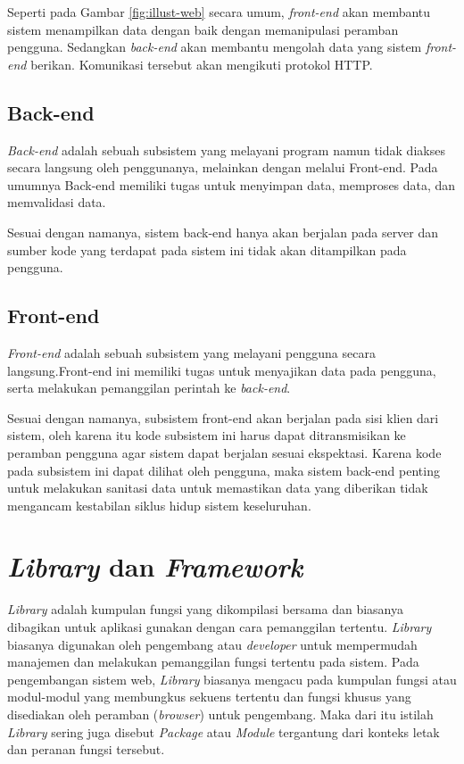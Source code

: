     Seperti pada Gambar \ref{fig:illust-web} secara umum, \textit{front-end} akan 
    membantu sistem menampilkan data dengan baik dengan memanipulasi peramban pengguna.
    Sedangkan \textit{back-end} akan membantu
    mengolah data yang sistem \textit{front-end} berikan. Komunikasi tersebut akan
    mengikuti protokol HTTP.

\subsection{Back-end}
    \textit{Back-end} adalah sebuah subsistem yang melayani program namun
    tidak diakses secara langsung oleh penggunanya, melainkan dengan melalui
    Front-end\cite{oxford:definition-backend}. Pada umumnya Back-end memiliki
    tugas untuk menyimpan data, memproses data, dan memvalidasi data.
    
    Sesuai dengan namanya, sistem back-end hanya akan berjalan pada server dan
    sumber kode yang terdapat pada sistem ini tidak akan ditampilkan pada
    pengguna.

\subsection{Front-end}
    \textit{Front-end} adalah sebuah subsistem yang
    melayani pengguna secara langsung\cite{oxford:definition-frontend}.Front-end
    ini memiliki tugas untuk menyajikan data pada pengguna, serta melakukan
    pemanggilan perintah ke \textit{back-end}.
    
    Sesuai dengan namanya, subsistem front-end akan berjalan pada sisi klien
    dari sistem, oleh karena itu kode subsistem ini harus dapat ditransmisikan
    ke peramban pengguna agar sistem dapat berjalan sesuai ekspektasi. Karena
    kode pada subsistem ini dapat dilihat oleh pengguna, maka sistem back-end
    penting untuk melakukan sanitasi data untuk memastikan data yang diberikan
    tidak mengancam kestabilan siklus hidup sistem keseluruhan.

\section{\textit{Library} dan \textit{Framework}}
    \textit{Library} adalah kumpulan fungsi yang dikompilasi bersama dan
    biasanya dibagikan untuk aplikasi gunakan dengan cara pemanggilan tertentu.
    \textit{Library} biasanya digunakan oleh pengembang atau \emph{developer}
    untuk mempermudah manajemen dan melakukan pemanggilan fungsi tertentu pada
    sistem. Pada pengembangan sistem web, \textit{Library} biasanya mengacu pada
    kumpulan fungsi atau modul-modul yang membungkus sekuens tertentu dan fungsi
    khusus yang disediakan oleh peramban (\textit{browser}) untuk pengembang.
    Maka dari itu istilah \textit{Library} sering juga disebut \textit{Package}
    atau \textit{Module} tergantung dari konteks letak dan peranan fungsi
    tersebut\cite{npm-docs:packages-n-modules}\cite{node-docs:CommonJS-modules}.
    
